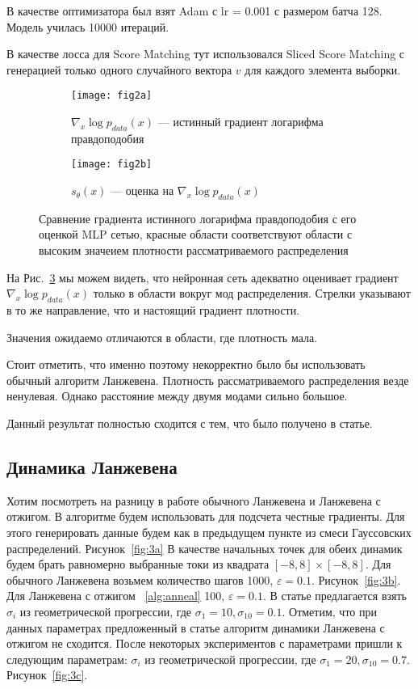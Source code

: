 \documentclass{article}
\begin{document}
В качестве оптимизатора был взят Adam с lr = 0.001 с размером батча 128. 
Модель училась 10000 итераций.

В качестве лосса для Score Matching тут использовался Sliced Score Matching с
генерацией только одного случайного вектора $v$ для каждого элемента выборки.

\begin{figure}[H]
  \centering
  \begin{subfigure}[b]{0.45\textwidth}
  	\texttt{[image: fig2a]}
  	\caption{$\nabla_x \log p_{data}(x)$ --- истинный градиент логарифма правдоподобия}
  	\label{fig:2a}
  \end{subfigure}
  \begin{subfigure}[b]{0.45\textwidth}
    \centering
    \texttt{[image: fig2b]}
    \caption{$s_{\theta}(x)$ --- оценка на $\nabla_x \log p_{data}(x)$}
    \label{fig:2b}
  \end{subfigure}
  \caption{Сравнение градиента истинного логарифма правдоподобия с его оценкой
  MLP сетью, красные области соответствуют области с высоким значеием плотности
  рассматриваемого распределения}
  \label{fig:2}
\end{figure}

На Рис.~\ref{fig:2} мы можем видеть, что нейронная сеть адекватно оценивает
градиент $\nabla_x \log p_{data}(x)$ только в области вокруг мод распределения.
Стрелки указывают в то же направление, что и настоящий градиент плотности.

Значения ожидаемо отличаются в области, где плотность мала.

Стоит отметить, что именно поэтому некорректно было бы использовать обычный
алгоритм Ланжевена. Плотность рассматриваемого распределения везде ненулевая.
Однако расстояние между двумя модами сильно большое.

Данный результат полностью сходится с тем, что было получено в статье.

\subsection{Динамика Ланжевена}

Хотим посмотреть на разницу в работе обычного Ланжевена и Ланжевена с отжигом. В алгоритме будем использовать для подсчета честные градиенты. Для этого генерировать данные будем как в предыдущем пункте из смеси Гауссовских распределений. Рисунок~\ref{fig:3a} В качестве начальных точек для обеих динамик будем брать равномерно выбранные токи из квадрата $[-8, 8] \times [-8, 8]$.  Для обычного Ланжевена возьмем  количество шагов 1000, $\varepsilon=0.1$. Рисунок~\ref{fig:3b}. Для Ланжевена с отжигом ~\ref{alg:anneal} 100, $\varepsilon=0.1$. В статье предлагается взять $\sigma_i$ из геометрической прогрессии, где $\sigma_{1} = 10, \sigma_{10} = 0.1$. Отметим, что при данных параметрах предложенный  в статье алгоритм динамики Ланжевена с отжигом не сходится. После некоторых экспериментов с параметрами пришли к следующим параметрам:
$\sigma_i$ из геометрической прогрессии, где $\sigma_{1} = 20, \sigma_{10} = 0.7$. Рисунок~\ref{fig:3c}.
\end{document}
